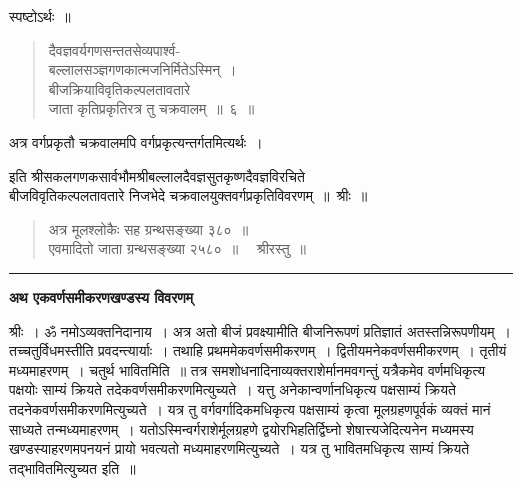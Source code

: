 \documentclass[11pt, openany]{book}
\begin{document}
\noindent स्पष्टोऽर्थः~॥\\

\begin{quote}
    \qt
     दैवज्ञवर्यगणसन्ततसेव्यपार्श्व- \\

\vspace{-7mm}
\hspace{1cm} बल्लालसञ्ज्ञगणकात्मजनिर्मितेऽस्मिन्~। \\

\vspace{-7mm}
 बीजक्रियाविवृतिकल्पलतावतारे \\

\vspace{-7mm}
\hspace{1cm} जाता कृतिप्रकृतिरत्र तु चक्रवालम्~॥~६~॥~
\end{quote}

अत्र वर्गप्रकृतौ चक्रवालमपि वर्गप्रकृत्यन्तर्गतमित्यर्थः~। 

\begin{center}
इति श्रीसकलगणकसार्वभौमश्रीबल्लालदैवज्ञसुतकृष्णदैवज्ञविरचिते \\
बीजविवृतिकल्पलतावतारे निजभेदे चक्रवालयुक्तवर्गप्रकृतिविवरणम्~॥~श्रीः~॥
\end{center}

\begin{quote}
    अत्र मूलश्लोकैः सह ग्रन्थसङ्ख्या ३८०~॥~\\
 एवमादितो जाता ग्रन्थसङ्ख्या २५८०~॥ ~~श्रीरस्तु~॥
\end{quote}
 
\begin{center}
    \rule{0.1\textwidth}{0.7pt}
\end{center}
\newpage
 \label{ekavarna}
\begin{center}
    \textbf{\LARGE अथ एकवर्णसमीकरणखण्डस्य विवरणम्}
\end{center}
 
  \vspace{2mm}
 श्रीः~। ॐ नमोऽव्यक्तनिदानाय~। अत्र अतो बीजं प्रवक्ष्यामीति
बीजनिरूपणं प्रतिज्ञातं अतस्तन्निरूपणीयम्~। तच्चतुर्विधमस्तीति प्रवदन्त्यार्याः~। 
तथाहि प्रथममेकवर्णसमीकरणम्~। द्वितीयमनेकवर्णसमीकरणम्~। तृतीयं मध्यमाहरणम्~। 
चतुर्थ भावितमिति~॥ तत्र समशोधनादिनाव्यक्तराशेर्मानमवगन्तुं यत्रैकमेव
वर्णमधिकृत्य पक्षयोः साम्यं क्रियते तदेकवर्णसमीकरणमित्युच्यते~। यत्तु 
अनेकान्वर्णानधिकृत्य पक्षसाम्यं क्रियते तदनेकवर्णसमीकरणमित्युच्यते~। यत्र 
तु वर्गवर्गादिकमधिकृत्य पक्षसाम्यं कृत्वा मूलग्रहणपूर्वकं व्यक्तं मानं साध्यते 
तन्मध्यमाहरणम्~। यतोऽस्मिन्वर्गराशेर्मूलग्रहणे द्वयोरभिहतिर्द्विघ्नो शेषात्त्यजेदित्यनेन मध्यमस्य खण्डस्याहरणमपनयनं प्रायो भवत्यतो मध्यमाहरणमित्युच्यते~। यत्र तु भावितमधिकृत्य साम्यं क्रियते तद्भावितमित्युच्यत इति~॥~\\
\end{document}
